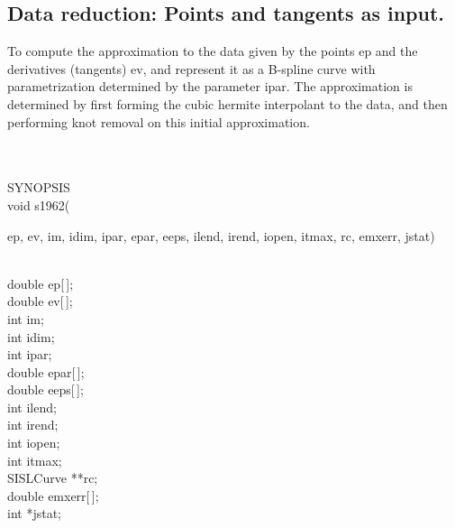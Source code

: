 \subsection{Data reduction: Points and tangents as input.}
\begin{minipg1}
To compute the approximation to the data given by the points
           ep and the derivatives (tangents) ev, and represent it as a
           B-spline curve with parametrization determined by the parameter
           ipar. The approximation is determined by first forming the cubic
           hermite interpolant to the data, and then performing knot
           removal on this initial approximation.
\end{minipg1} \\ \\
SYNOPSIS\\
        \> void s1962(\begin{minipg3}
            {\fov ep}, {\fov ev}, {\fov im}, {\fov idim}, {\fov ipar}, {\fov epar}, {\fov eeps}, {\fov ilend}, {\fov irend}, {\fov iopen}, {\fov itmax},
            {\fov rc}, {\fov emxerr}, {\fov jstat})
                \end{minipg3}\\
                \>\>    double \> {\fov ep}[\,];\\
                \>\>    double \> {\fov ev}[\,];\\
                \>\>    int    \>  {\fov im};\\
                \>\>    int    \>  {\fov idim};\\
                \>\>    int    \>  {\fov ipar};\\
                \>\>    double \> {\fov epar}[\,];\\
                \>\>    double \> {\fov eeps}[\,];\\
                \>\>    int    \>  {\fov ilend};\\
                \>\>    int    \>  {\fov irend};\\
                \>\>    int    \>  {\fov iopen};\\
                \>\>    int    \>  {\fov itmax};\\
                \>\>    SISLCurve    \>  **{\fov rc};\\
                \>\>    double \> {\fov emxerr}[\,];\\
                \>\>    int    \>  *{\fov jstat};\\
\\
